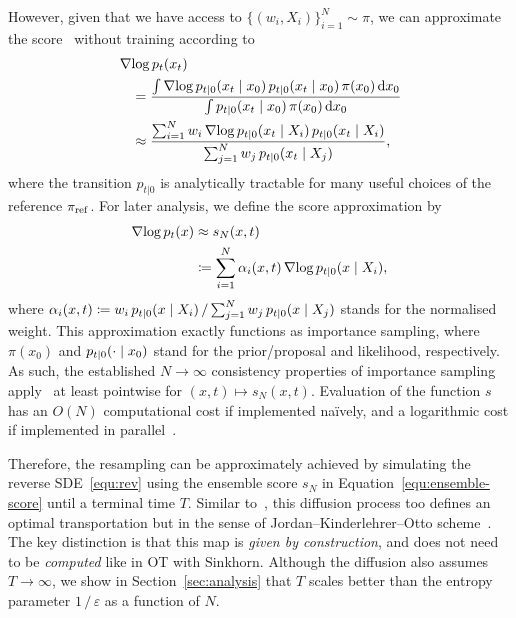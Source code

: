 \documentclass{article}
\begin{document}
However, given that we have access to $\lbrace (w_i, X_i) \rbrace_{i=1}^N \sim \pi$, we can approximate the score~\citep{BaoEnsScore2024} without training according to
%
\begin{equation}
    \begin{split}
        &\operatorname{\nabla\!} \log p_t(x_t) \\
        &\quad= \frac{\int \operatorname{\nabla\!} \log p_{t|0}(x_t {\;|\;} x_0) \, p_{t|0}(x_t {\;|\;} x_0)\, \pi(x_0) \mathop{}\!\mathrm{d} x_0}{\int p_{t|0}(x_t {\;|\;} x_0) \, \pi(x_0) \mathop{}\!\mathrm{d} x_0} \\
        &\quad\approx \frac{\sum_{i=1}^N w_i \operatorname{\nabla\!} \log p_{t|0}(x_t {\;|\;} X_i) \, p_{t|0}(x_t {\;|\;} X_i)}{\sum_{j=1}^N w_j \, p_{t|0}(x_t {\;|\;} X_j)},
    \end{split}
\end{equation}
%
where the transition $p_{t | 0}$ is analytically tractable for many useful choices of the reference $\pi_{\mathrm{ref}}$. 
For later analysis, we define the score approximation by
%
\begin{equation}
    \begin{split}
        \begin{split}
            \operatorname{\nabla\!}\log p_t(x) &\approx s_N(x, t) \\
            &\coloneqq \sum_{i=1}^N \alpha_i(x, t) \operatorname{\nabla\!}\log p_{t|0}(x {\;|\;} X_i),
        \end{split}
    \end{split}
    \label{equ:ensemble-score}
\end{equation}
%
where $\alpha_i(x, t) \coloneqq w_i \, p_{t|0}(x {\;|\;} X_i) \, / \sum_{j=1}^N w_j \, p_{t|0}(x {\;|\;} X_j)$ stands for the normalised weight. 
This approximation exactly functions as importance sampling, where $\pi(x_0)$ and $p_{t|0}(\cdot {\;|\;} x_0)$ stand for the prior/proposal and likelihood, respectively. 
As such, the established $N\to\infty$ consistency properties of importance sampling apply~\citep{ChopinBook2020} at least pointwise for $(x, t) \mapsto s_N(x, t)$.
Evaluation of the function $s$ has an $O(N)$ computational cost if implemented na\"{i}vely, and a logarithmic cost if implemented in parallel~\citep{Lee01012010}. 

Therefore, the resampling can be approximately achieved by simulating the reverse SDE~\eqref{equ:rev} using the ensemble score $s_N$ in Equation~\eqref{equ:ensemble-score} until a terminal time $T$. 
Similar to~\citet{Corenflos2021}, this diffusion process too defines an optimal transportation but in the sense of Jordan--Kinderlehrer--Otto scheme~\citep{Jordan1998}. 
The key distinction is that this map is \emph{given by construction}, and does not need to be \emph{computed} like in OT with Sinkhorn. 
Although the diffusion also assumes $T\to\infty$, we show in Section~\ref{sec:analysis} that $T$ scales better than the entropy parameter $1\,/\,\varepsilon$ as a function of $N$. 
\end{document}
